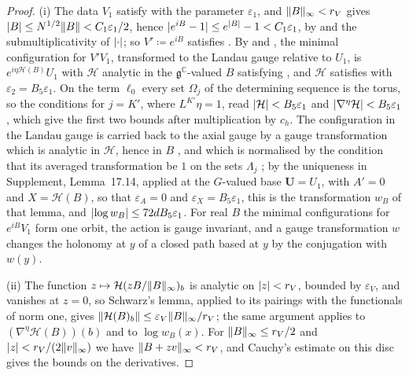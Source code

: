 \documentclass[11pt]{preprint}
\DeclarePairedDelimiter{\abs}{\lvert}{\rvert}
\DeclarePairedDelimiter{\norm}{\lVert}{\rVert}
\numberwithin{equation}{section}
\theoremstyle{definition}
\theoremstyle{remark}
\theoremstyle{plain}
\begin{document}
\begin{proof}
(i) The data $V_1$ satisfy \cite[(7), p.~278]{BalabanVAR} with the parameter $\varepsilon_1$, and $\norm B_\infty < r_V$ gives $\abs B \leq N^{1/2}\norm B < C_1\varepsilon_1/2$, hence $\abs{e^{iB} - 1} \leq e^{\abs B} - 1 < C_1\varepsilon_1$, by \cite[(20), p.~21]{BalabanAVG} and the submultiplicativity of $\abs\cdot$; so $V' \coloneqq e^{iB}$ satisfies \cite[(172), p.~305]{BalabanVAR}. By \cite[Proposition~9, p.~309]{BalabanVAR} and \cite[pp.~305--307]{BalabanVAR}, the minimal configuration for $V'V_1$, transformed to the Landau gauge relative to $U_1$, is $e^{i\eta\mathcal H(B)}U_1$ with $\mathcal H$ analytic in the $\mathfrak g^{\mathbb C}$-valued $B$ satisfying \cite[(172)]{BalabanVAR} \cite[p.~307, ll.~1--2]{BalabanVAR}, and $\mathcal H$ satisfies \cite[(19)--(21), p.~281]{BalabanVAR} with $\varepsilon_2 = B_5\varepsilon_1$. On the term $\ell_0$ every set $\Omega_j$ of the determining sequence is the torus, so the conditions \cite[(19)]{BalabanVAR} for $j = K'$, where $L^{K'}\eta = 1$, read $\abs{\mathcal H} < B_5\varepsilon_1$ and $\abs{\nabla^\eta\mathcal H} < B_5\varepsilon_1$, which give the first two bounds after multiplication by $c_h$. The configuration in the Landau gauge is carried back to the axial gauge by a gauge transformation which is analytic in $\mathcal H$, hence in $B$ \cite[p.~307, ll.~2--5]{BalabanVAR}, and which is normalised by the condition that its averaged transformation be $1$ on the sets $\Lambda_j$ \cite[p.~281, ll.~1--3]{BalabanVAR}; by the uniqueness in Supplement, Lemma~17.14, applied at the $G$-valued base $\mathbf U = U_1$, with $A' = 0$ and $X = \mathcal H(B)$, so that $\varepsilon_A = 0$ and $\varepsilon_X = B_5\varepsilon_1$, this is the transformation $w_B$ of that lemma, and $\abs{\log w_B} \leq 72dB_5\varepsilon_1$. For real $B$ the minimal configurations for $e^{iB}V_1$ form one orbit, the action is gauge invariant, and a gauge transformation $w$ changes the holonomy at $y$ of a closed path based at $y$ by the conjugation with $w(y)$.

(ii) The function $z \mapsto \mathcal H(zB/\norm B_\infty)_b$ is analytic on $\abs z < r_V$, bounded by $\varepsilon_V$, and vanishes at $z = 0$, so Schwarz's lemma, applied to its pairings with the functionals of norm one, gives $\norm{\mathcal H(B)_b} \leq \varepsilon_V\norm B_\infty/r_V$; the same argument applies to $(\nabla^\eta\mathcal H(B))(b)$ and to $\log w_B(x)$. For $\norm B_\infty \leq r_V/2$ and $\abs z < r_V/(2\norm v_\infty)$ we have $\norm{B + zv}_\infty < r_V$, and Cauchy's estimate on this disc gives the bounds on the derivatives.
\end{proof}
\end{document}
